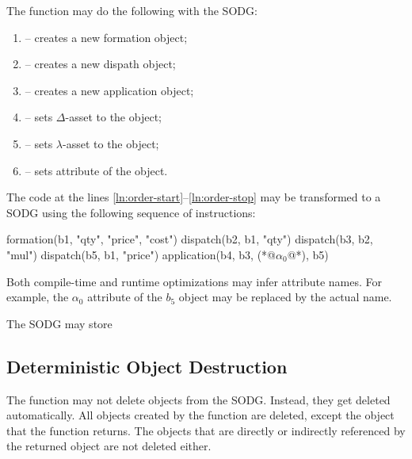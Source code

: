 The function may do the following with the SODG:
\begin{enumerate}
  \item {} -- creates a new formation object;
  \item {} -- creates a new dispath object;
  \item {} -- creates a new application object;
  \item {} -- sets \(\Delta\)-asset to the object;
  \item {} -- sets \(\lambda\)-asset to the object;
  \item {} -- sets attribute of the object.
\end{enumerate}

The code at the lines \ref{ln:order-start}--\ref{ln:order-stop} may be transformed to a SODG using the following sequence of instructions:

\begin{ffcode}
formation(b1, "qty", "price", "cost")
dispatch(b2, b1, "qty")
dispatch(b3, b2, "mul")
dispatch(b5, b1, "price")
application(b4, b3, (*@\(\alpha_0\)@*), b5)
\end{ffcode}

Both compile-time and runtime optimizations may infer attribute names.
For example, the \(\alpha_0\) attribute of the \(b_5\) object may be replaced by the actual name.

The SODG may store

\subsection{Deterministic Object Destruction}

The function may not delete objects from the SODG.
Instead, they get deleted automatically.
All objects created by the function are deleted, except the object that the function returns.
The objects that are directly or indirectly referenced by the returned object are not deleted either.
